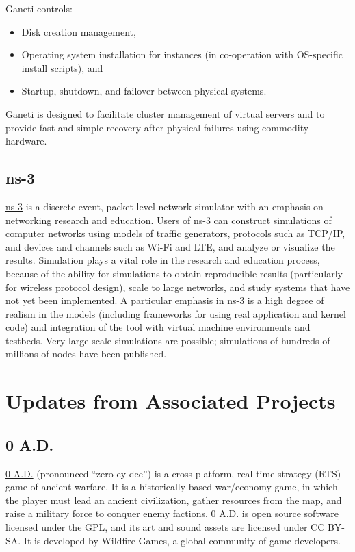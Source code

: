 \documentclass[a4paper]{report}
\begin{document}
Ganeti controls:

\begin{itemize}

\item Disk creation management,
\item Operating system installation for instances (in co-operation with OS-specific install scripts), and
\item Startup, shutdown, and failover between physical systems.

\end{itemize}

Ganeti is designed to facilitate cluster management of virtual servers and to provide fast and simple recovery after physical failures using commodity hardware.

\subsection{ns-3}

\href{https://www.nsnam.org/}{ns-3} is a discrete-event, packet-level network simulator with an emphasis on networking research and education. Users of ns-3 can construct simulations of computer networks using models of traffic generators, protocols such as TCP/IP, and devices and channels such as Wi-Fi and LTE, and analyze or visualize the results. Simulation plays a vital role in the research and education process, because of the ability for simulations to obtain reproducible results (particularly for wireless protocol design), scale to large networks, and study systems that have not yet been implemented. A particular emphasis in ns-3 is a high degree of realism in the models (including frameworks for using real application and kernel code) and integration of the tool with virtual machine environments and testbeds. Very large scale simulations are possible; simulations of hundreds of millions of nodes have been published.

\section{Updates from Associated Projects}

\subsection{0 A.D.}

\href{https://play0ad.com/}{0 A.D.} (pronounced ``zero ey-dee'') is a cross-platform, real-time strategy (RTS) game of ancient warfare. It is a historically-based war/economy game, in which the player must lead an ancient civilization, gather resources from the map, and raise a military force to conquer enemy factions. 0 A.D. is open source software licensed under the GPL, and its art and sound assets are licensed under CC BY-SA. It is developed by Wildfire Games, a global community of game developers.
\end{document}
